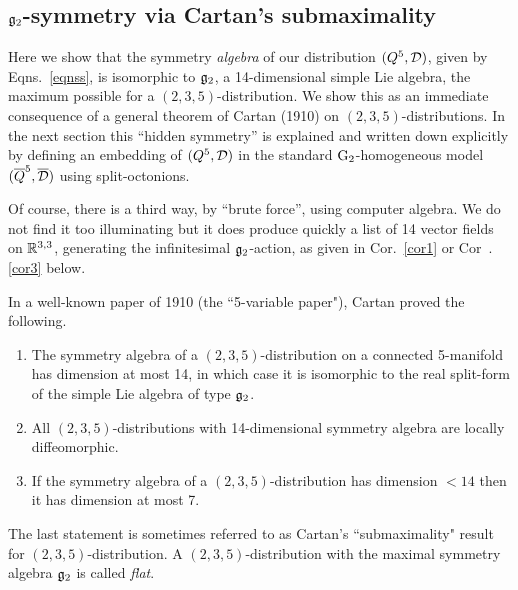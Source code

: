 

\subsection{${\mathfrak{g}}_2$-symmetry via Cartan's submaximality} \label{three_five}Here we show that the symmetry {\em algebra} of our distribution $(Q^5,{\mathcal D})$, given by Eqns.~\eqref{eqnss}, is isomorphic to  ${\mathfrak{g}}_2$, a 14-dimensional simple Lie algebra, the maximum possible for a $(2,3,5)$-distribution. We show this  as an immediate consequence of  a general theorem of Cartan (1910) on $(2,3,5)$-distributions. In the next section this ``hidden symmetry'' is explained and written down explicitly by defining an  embedding  of $(Q^5,{\mathcal D})$ in the standard ${\rm G}_2$-homogeneous model $(\overline{Q}^5, \overline{\mathcal D})$ using split-octonions. 



\begin{rmrk} Of course, there is a third way, by ``brute force'', using computer algebra. We do not find it too illuminating but it does produce quickly  a  list of 14 vector fields on $\mathbb{R}^{3,3}$, generating the infinitesimal ${\mathfrak{g}}_2$-action, as given in Cor.~\ref{cor1}  or Cor~.\ref{cor3}  below. 
\end{rmrk}




In a well-known paper of 1910 (the ``5-variable paper"), Cartan proved
the following.


\begin{theorem} 

\sn

 

\begin{enumerate}
\item The symmetry algebra of a $(2,3,5)$-distribution on a connected 5-manifold has dimension at most 14, in which case it is isomorphic to the real split-form of
the simple Lie algebra of type ${\mathfrak{g}}_2$.
\item  All $(2,3,5)$-distributions with 14-dimensional symmetry algebra are
locally diffeomorphic. 
\item If the  symmetry algebra of a $(2,3,5)$-distribution 
has dimension $<14$ then it has  dimension at most 7.
\end{enumerate}
\end{theorem}
%
The last statement is sometimes referred to as Cartan's
``submaximality" result for $(2,3,5)$-distribution. A $(2,3,5)$-distribution with the maximal symmetry algebra ${\mathfrak{g}}_2$ is called {\em flat}. 




